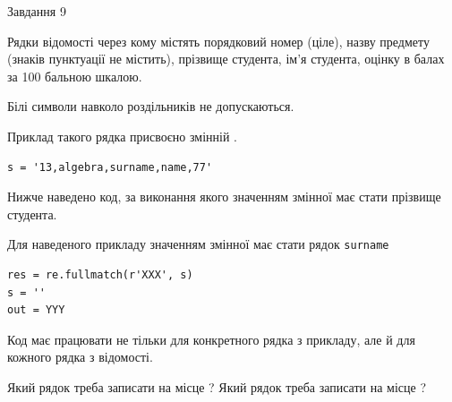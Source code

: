 \documentclass[12pt, ukrainian]{article}
\def\code#1{\Verb!#1!}
\begin{document}
{\begin{minipage}[t]{8.0cm}
\end{minipage}

               
{\begin{center}Завдання {9}\end{center}}
\vspace{-6mm}
Рядки відомості через кому містять порядковий номер (ціле), назву предмету (зна\-ків пунктуації не містить), прізвище студента, ім'я студента, оцінку в балах за 100 бальною шкалою.

Білі символи навколо роздільників не допускаються.

Приклад такого рядка присвоєно змінній .



\begin{verbatim}
s = '13,algebra,surname,name,77'
\end{verbatim}


Нижче наведено код, за виконання якого значенням змінної  має стати прізвище студента.

Для наведеного прикладу значенням змінної  має стати рядок \code{surname}



\begin{verbatim}
res = re.fullmatch(r'XXX', s)
s = ''
out = YYY
\end{verbatim}


Код має працювати не тільки для конкретного рядка з прикладу, але й для кожного рядка з відомості.


Який рядок треба записати на місце  ?
Який рядок треба записати на місце  ?\par

}
\newpage
\end{document}

